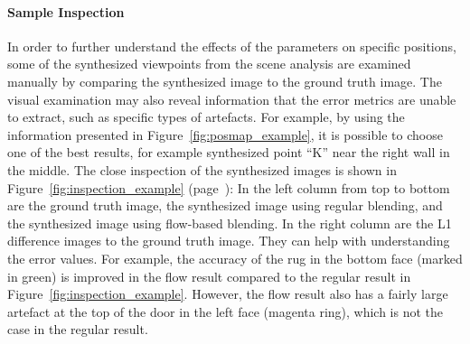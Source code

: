 \paragraph{Sample Inspection}
In order to further understand the effects of the parameters on specific positions, some of the synthesized viewpoints from the scene analysis are examined manually by comparing the synthesized image to the ground truth image. The visual examination may also reveal information that the error metrics are unable to extract, such as specific types of artefacts. For example, by using the information presented in Figure~\ref{fig:posmap_example}, it is possible to choose one of the best results, for example synthesized point ``K'' near the right wall in the middle. The close inspection of the synthesized images is shown in Figure~\ref{fig:inspection_example} (page~\pageref{fig:inspection_example}\footnotemark): In the left column from top to bottom are the ground truth image, the synthesized image using regular blending, and the synthesized image using flow-based blending. In the right column are the L1 difference images to the ground truth image. They can help with understanding the error values. For example, the accuracy of the rug in the bottom face (marked in green) is improved in the flow result compared to the regular result in Figure~\ref{fig:inspection_example}. However, the flow result also has a fairly large artefact at the top of the door in the left face (magenta ring), which is not the case in the regular result.















